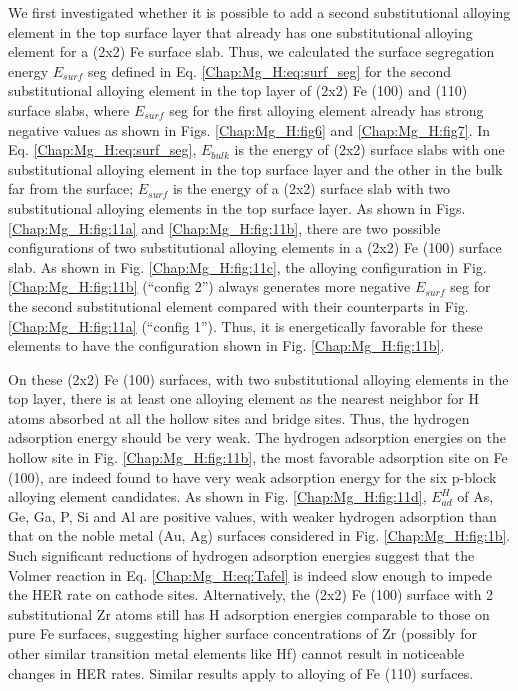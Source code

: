 We first investigated whether it is possible to add a second substitutional alloying element in the top surface layer that already has one substitutional alloying element for a (2x2) Fe surface slab. Thus, we calculated the surface segregation energy $E_{surf}$ seg defined in Eq. \ref{Chap:Mg_H:eq:surf_seg} for the second substitutional alloying element in the top layer of (2x2) Fe (100) and (110) surface slabs, where $E_{surf}$ seg for the first alloying element already has strong negative values as shown in Figs. \ref{Chap:Mg_H:fig6} and \ref{Chap:Mg_H:fig7}. In Eq. \ref{Chap:Mg_H:eq:surf_seg}, $E_{bulk}$ is the energy of (2x2) surface slabs with one substitutional alloying element in the top surface layer and the other in the bulk far from the surface; $E_{surf}$ is the energy of a (2x2) surface slab with two substitutional alloying elements in the top surface layer. As shown in Figs. \ref{Chap:Mg_H:fig:11a} and \ref{Chap:Mg_H:fig:11b}, there are two possible configurations of two substitutional alloying elements in a (2x2) Fe (100) surface slab. As shown in Fig. \ref{Chap:Mg_H:fig:11c}, the alloying configuration in Fig. \ref{Chap:Mg_H:fig:11b} (“config 2”) always generates more negative $E_{surf}$ seg for the second substitutional element compared with their counterparts in Fig. \ref{Chap:Mg_H:fig:11a} (“config 1”). Thus, it is energetically favorable for these elements to have the configuration shown in Fig. \ref{Chap:Mg_H:fig:11b}. 


On these (2x2) Fe (100) surfaces, with two substitutional alloying elements in the top layer, there is at least one alloying element as the nearest neighbor for H atoms absorbed at all the hollow sites and bridge sites. Thus, the hydrogen adsorption energy should be very weak. The hydrogen adsorption energies on the hollow site in Fig. \ref{Chap:Mg_H:fig:11b}, the most favorable adsorption site on Fe (100), are indeed found to have very weak adsorption energy for the six p-block alloying element candidates. As shown in Fig. \ref{Chap:Mg_H:fig:11d}, $E_{ad}^H$ of As, Ge, Ga, P, Si and Al are positive values, with weaker hydrogen adsorption than that on the noble metal (Au, Ag) surfaces considered in Fig. \ref{Chap:Mg_H:fig:1b}. Such significant reductions of hydrogen adsorption energies suggest that the Volmer reaction in Eq. \ref{Chap:Mg_H:eq:Tafel} is indeed slow enough to impede the \ac{HER} rate on cathode sites. Alternatively, the (2x2) Fe (100) surface with 2 substitutional Zr atoms still has H adsorption energies comparable to those on pure Fe surfaces, suggesting higher surface concentrations of Zr (possibly for other similar transition metal elements like Hf) cannot result in noticeable changes in \ac{HER} rates. Similar results apply to alloying of Fe (110) surfaces.


